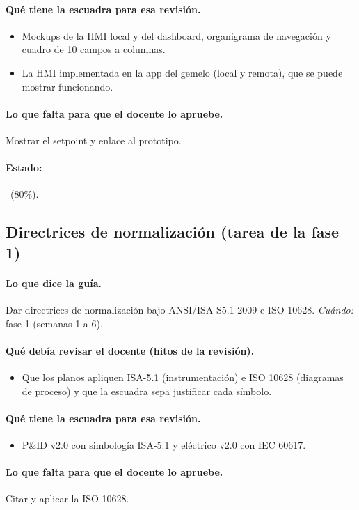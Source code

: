 \documentclass[a4paper,11pt]{article}
\begin{document}
\paragraph{Qué tiene la escuadra para esa revisión.}
\begin{itemize}
\item Mockups de la HMI local y del dashboard, organigrama de navegación y cuadro de 10 campos a columnas.
\item La HMI implementada en la app del gemelo (local y remota), que se puede mostrar funcionando.
\end{itemize}
\paragraph{Lo que falta para que el docente lo apruebe.} Mostrar el setpoint y enlace al prototipo.
\paragraph{Estado:} \parcial~(80\%).
\subsection{Directrices de normalización (tarea de la fase 1)}
\paragraph{Lo que dice la guía.} Dar directrices de normalización bajo ANSI/ISA-S5.1-2009 e ISO 10628. \textit{Cuándo:} fase 1 (semanas 1 a 6).
\paragraph{Qué debía revisar el docente (hitos de la revisión).}
\begin{itemize}
\item[$\square$] Que los planos apliquen ISA-5.1 (instrumentación) e ISO 10628 (diagramas de proceso) y que la escuadra sepa justificar cada símbolo.
\end{itemize}
\paragraph{Qué tiene la escuadra para esa revisión.}
\begin{itemize}
\item P\&ID v2.0 con simbología ISA-5.1 y eléctrico v2.0 con IEC 60617.
\end{itemize}
\paragraph{Lo que falta para que el docente lo apruebe.} Citar y aplicar la ISO 10628.
\end{document}

